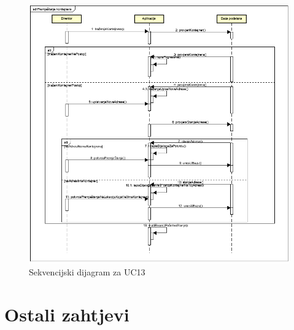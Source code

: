 			\clearpage	 
			
			\begin{figure}
				\centering
				\includegraphics[width=1.1\linewidth]{"slike/Sekvencijski dijagram za premjestanje kontejnera"}
				\caption{Sekvencijski dijagram za UC13}
				\label{fig:sekvencijski-dijagram-za-premjestanje-kontejnera}
			\end{figure}
			
			\clearpage	 

			\section{Ostali zahtjevi}


